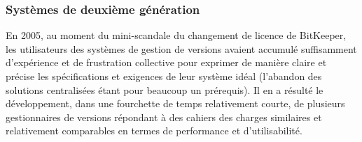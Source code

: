 \subsubsection{Systèmes de deuxième génération}

En 2005, au moment du mini-scandale du changement de licence de
BitKeeper, les utilisateurs des systèmes de gestion de versions
avaient accumulé suffisamment d'expérience et de frustration
collective pour exprimer de manière claire et précise les
spécifications et exigences de leur système idéal (l'abandon des
solutions centralisées étant pour beaucoup un prérequis). Il en a
résulté le développement, dans une fourchette de temps relativement
courte, de plusieurs gestionnaires de versions répondant à des
cahiers des charges similaires et relativement comparables en termes
de performance et d'utilisabilité.


